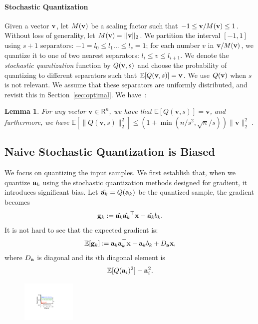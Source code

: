 \documentclass{article}
\newcommand{\R}{\mathsf{R}}
\renewcommand{\vec}[1]{\mathbf{#1}}
\def\a{{\bf a}}
\def\g{{\bf g}}
\def\x{{\bf x}}
\def\v{{\bf v}}
\def\E{\mathbb{E}}
\newtheorem{lemma}{Lemma}
\begin{document}
\vspace{-1em}
\paragraph*{Stochastic Quantization} 
Given a vector
$\v$, let $M(\v)$ be a scaling factor such that
$-1 \le \v/M(\v) \le 1$. Without loss of generality,
let $M(\v)=||\v||_2$. We partition
the interval $[-1, 1]$ using $s+1$ separators:
$-1 = l_0 \le l_1 ... \le l_{s} = 1$; for
each number $v$ in $\v/M(\v)$, we 
quantize it to one of two nearest 
separators: $l_i \le v \le l_{i+1}$. 
We denote the \emph{stochastic quantization} function by $Q(\v, s)$
and choose the probability of quantizing to
different separators such that $\E[Q(\v, s)] = \v$.
We use $Q(\v)$ when $s$ is not relevant.
We assume that these
separators are uniformly distributed,
and revisit this in Section~\ref{sec:optimal}.
We have~\cite{Alistarh:2016:ArXiv}: 
\begin{lemma}
\label{lem:quant-facts}
For any vector $\vec{v} \in \R^n$, we have that $\E [Q (\vec{v},s)] = \vec{v}$, and furthermore, we have
$
\E [\| Q (\vec{v},s) \|_2^2] \leq (1 + \min( n/s^2,\sqrt{n}/s)) \| \vec{v} \|_2^2 \; .
$
\end{lemma} 




\vspace{-0.5em}
\subsection{Naive Stochastic Quantization is Biased}

\vspace{-0.5em}
We focus on quantizing the input samples.
We first establish that, when we quantize $\a_k$
using the stochastic quantization methods designed
for gradient, it introduces significant bias.
Let $\hat{\a_k} = Q(\a_k)$ be the quantized
sample, the gradient becomes
\[
\g_k := \hat{\a_k} \hat{\a_k}^\top \x - \hat{\a_k} b_k.
\]
It is not hard to see that the expected gradient is: 
\[
\E[\g_k] := \a_k \a_k^\top \x - \a_k b_k + D_{\a} \x, 
\]
where $D_{\a}$ is diagonal and its $i$th diagonal element is 
\[
\E[ Q(\a_i)^2 ] - \a_i^2.
\]

\begin{figure}
  \begin{center}
    \includegraphics[width=0.23\textwidth]{micro-experiments/gap.pdf}
  \end{center}
  \label{fig:gap}
\end{figure}
\end{document}

